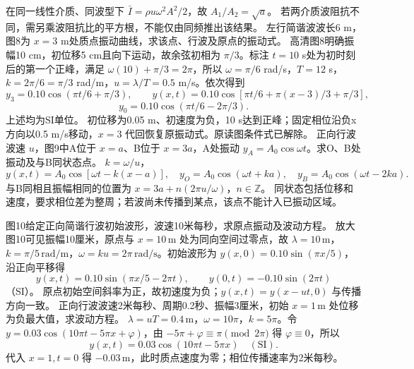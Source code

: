 \workings 在同一线性介质、同波型下 $\bar I=\rho u\omega^2A^2/2$，故 $A_1/A_2=\sqrt a$。
\crosscheck 若两介质波阻抗不同，需另乘波阻抗比的平方根，不能仅由同频推出该结果。
\problemtext 左行简谐波波长6 m，图8为 $x=3$ m处质点振动曲线，求该点、行波及原点的振动式。
\workings 高清图8明确振幅10 cm，初位移5 cm且向下运动，故余弦初相为 $\pi/3$。标注 $t=10$ s处为初时刻后的第一个正峰，满足 $\omega(10)+\pi/3=2\pi$，所以 $\omega=\pi/6$ rad/s，$T=12$ s，$k=2\pi/6=\pi/3$ rad/m，$u=\lambda/T=0.5$ m/s。依次得到
\[
y_3=0.10\cos(\pi t/6+\pi/3),\qquad
y(x,t)=0.10\cos[\pi t/6+\pi(x-3)/3+\pi/3],
\]
\[
y_0=0.10\cos(\pi t/6-2\pi/3).
\]
上述均为SI单位。
\crosscheck 初位移为0.05 m、初速度为负，10 s达到正峰；固定相位沿负x方向以0.5 m/s移动，$x=3$ 代回恢复原振动式。原读图条件式已解除。
\problemtext 正向行波波速 $u$，图9中A位于 $x=a$、B位于 $x=3a$，A处振动 $y_A=A_0\cos\omega t$。求O、B处振动及与B同状态点。
\workings $k=\omega/u$，
\[
y(x,t)=A_0\cos[\omega t-k(x-a)],\quad
y_O=A_0\cos(\omega t+ka),\quad
y_B=A_0\cos(\omega t-2ka).
\]
与B同相且振幅相同的位置为 $x=3a+n(2\pi u/\omega)$，$n\in\mathbb Z$。
\crosscheck 同状态包括位移和速度，要求相位差为整周；若波尚未传播到某点，该点不能计入已振动区域。

\problemtext 图10给定正向简谐行波初始波形，波速10米每秒，求原点振动及波动方程。
\workings 放大图10可见振幅10厘米，原点与 $x=10\,\mathrm m$ 处为同向空间过零点，故 $\lambda=10\,\mathrm m$，$k=\pi/5\,\mathrm{rad/m}$，$\omega=ku=2\pi\,\mathrm{rad/s}$。初始波形为 $y(x,0)=0.10\sin(\pi x/5)$，沿正向平移得
\[
y(x,t)=0.10\sin(\pi x/5-2\pi t),\qquad
y(0,t)=-0.10\sin(2\pi t)
\]
（SI）。
\crosscheck 原点初始空间斜率为正，故初速度为负；$y(x,t)=y(x-ut,0)$ 与传播方向一致。
\problemtext 正向行波波速2米每秒、周期0.2秒、振幅3厘米，初始 $x=1\,\mathrm m$ 处位移为负最大值，求波动方程。
\workings $\lambda=uT=0.4\,\mathrm m$，$\omega=10\pi$，$k=5\pi$。令 $y=0.03\cos(10\pi t-5\pi x+\varphi)$，由 $-5\pi+\varphi\equiv\pi\pmod{2\pi}$ 得 $\varphi\equiv0$，所以
\[
y(x,t)=0.03\cos(10\pi t-5\pi x)\quad(\mathrm{SI}).
\]
\crosscheck 代入 $x=1,t=0$ 得 $-0.03\,\mathrm m$，此时质点速度为零；相位传播速率为2米每秒。
